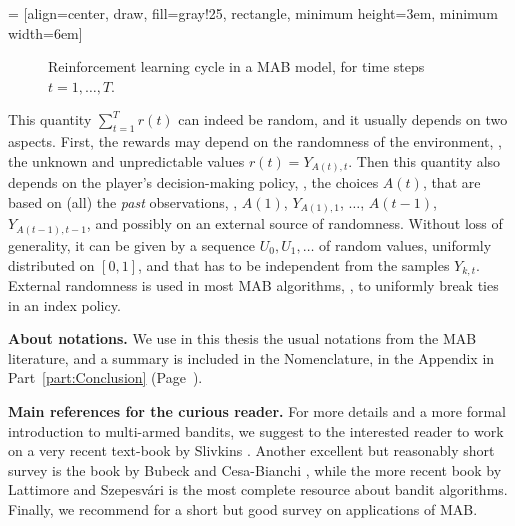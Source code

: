  = [align=center, draw, fill=gray!25, rectangle, minimum height=3em, minimum width=6em]
\begin{figure}[h!]
    \centering
\caption{Reinforcement learning cycle in a MAB model, for time steps $t=1,\dots,T$.}
\label{fig:2:ReinforcementLearningCycleMABmodel}
\end{figure}


\label{par:2:externalrandomness}
This quantity $\sum_{t=1}^T r(t)$ can indeed be random, and it usually depends on two aspects.
First, the rewards may depend on the randomness of the environment, \ie, the unknown and unpredictable values $r(t)=Y_{A(t),t}$.
Then this quantity also depends on the player's decision-making policy, \ie, the choices $A(t)$, that are based on (all) the \emph{past} observations, \ie, $A(1)$, $Y_{A(1),1}$, $\dots$, $A(t-1)$, $Y_{A(t-1),t-1}$, and possibly on an external source of randomness.
%
Without loss of generality, it can be given by a sequence $U_0,U_1,\dots$ of \iid{} random values, uniformly distributed on $[0,1]$, and that has to be independent from the samples $Y_{k,t}$.
External randomness is used in most MAB algorithms, \eg, to uniformly break ties in an index policy.


\textbf{About notations.}
%
We use in this thesis the usual notations from the MAB literature,
and a summary is included in the Nomenclature, in the Appendix in Part~\ref{part:Conclusion} (Page~\pageref{chapter:nomenclature}).


\textbf{Main references for the curious reader.}
%
For more details and a more formal introduction to multi-armed bandits, we suggest to the interested reader to work on a very recent text-book by Slivkins \cite{Slivkins2019}.
Another excellent but reasonably short survey is the book by Bubeck and Cesa-Bianchi \cite{Bubeck12}, while the more recent book by Lattimore and Szepesv{\'a}ri \cite{LattimoreBanditAlgorithmsBook} is the most complete resource about bandit algorithms.
Finally, we recommend \cite{bouneffouf2019survey} for a short but good survey on applications of MAB.


